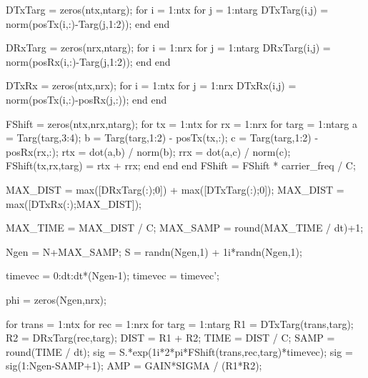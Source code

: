 \documentclass[12pt,openany,a4paper]{book}
\begin{document}
\begin{spverbatim}
DTxTarg = zeros(ntx,ntarg);
for i = 1:ntx
    for j = 1:ntarg
        DTxTarg(i,j) = norm(posTx(i,:)-Targ(j,1:2));
    end
end

DRxTarg = zeros(nrx,ntarg);
for i = 1:nrx
    for j = 1:ntarg
        DRxTarg(i,j) = norm(posRx(i,:)-Targ(j,1:2));
    end
end

DTxRx = zeros(ntx,nrx);
for i = 1:ntx
    for j = 1:nrx
        DTxRx(i,j) = norm(posTx(i,:)-posRx(j,:));
    end
end

FShift = zeros(ntx,nrx,ntarg);
for tx = 1:ntx
    for rx = 1:nrx
        for targ = 1:ntarg
            a = Targ(targ,3:4); %
            b = Targ(targ,1:2) - posTx(tx,:);
            c = Targ(targ,1:2) - posRx(rx,:);
            rtx = dot(a,b) / norm(b);   %
            rrx = dot(a,c) / norm(c);   %
            FShift(tx,rx,targ) = rtx + rrx;
        end
    end
end
FShift = FShift * carrier_freq / C; %

MAX_DIST = max([DRxTarg(:);0]) + max([DTxTarg(:);0]);
MAX_DIST = max([DTxRx(:);MAX_DIST]);

MAX_TIME = MAX_DIST / C;
MAX_SAMP = round(MAX_TIME / dt)+1;

Ngen = N+MAX_SAMP;
S = randn(Ngen,1) + 1i*randn(Ngen,1);

timevec = 0:dt:dt*(Ngen-1);
timevec = timevec'; %

phi = zeros(Ngen,nrx);

for trans = 1:ntx
    for rec = 1:nrx
        for targ = 1:ntarg
            R1 = DTxTarg(trans,targ);
            R2 = DRxTarg(rec,targ);
            DIST = R1 + R2;
            TIME = DIST / C;
            SAMP = round(TIME / dt);
            sig = S.*exp(1i*2*pi*FShift(trans,rec,targ)*timevec);
            sig = sig(1:Ngen-SAMP+1); 
            AMP = GAIN*SIGMA / (R1*R2); %
            

\end{spverbatim}
\end{document}
